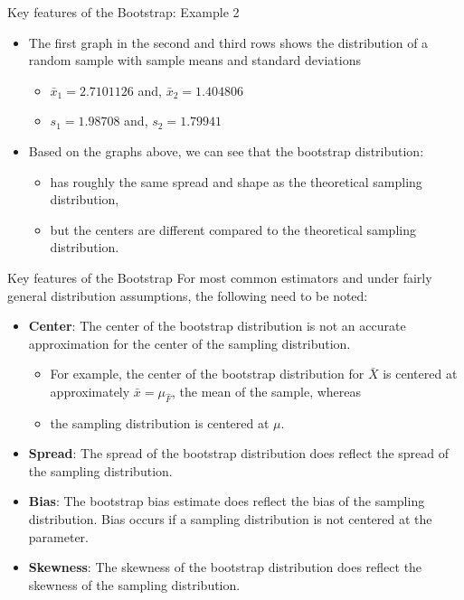\documentclass[
  ignorenonframetext,
]{beamer}
\providecommand{\tightlist}{%
  \setlength{\itemsep}{0pt}\setlength{\parskip}{0pt}}
\begin{document}
\begin{frame}{Key features of the Bootstrap: Example 2}
\label{key-features-of-the-bootstrap-example-2-3}
\begin{itemize}
\item
  The first graph in the second and third rows shows the distribution of
  a random sample with sample means and standard deviations

  \begin{itemize}
  \tightlist
  \item
    \(\bar{x}_1= 2.7101126\) and, \(\bar{x}_2=1.404806\)
  \item
    \(s_1= 1.98708\) and, \(s_2=1.79941\)
  \end{itemize}
\item
  Based on the graphs above, we can see that the bootstrap distribution:

  \begin{itemize}
  \tightlist
  \item
    has roughly the same spread and shape as the theoretical sampling
    distribution,
  \item
    but the centers are different compared to the theoretical sampling
    distribution.
  \end{itemize}
\end{itemize}
\end{frame}

\begin{frame}{Key features of the Bootstrap}
\label{key-features-of-the-bootstrap-1}
For most common estimators and under fairly general distribution
assumptions, the following need to be noted:

\begin{itemize}
\item
  \textbf{Center}: The center of the bootstrap distribution is not an
  accurate approximation for the center of the sampling distribution.

  \begin{itemize}
  \tightlist
  \item
    For example, the center of the bootstrap distribution for
    \(\bar{X}\) is centered at approximately \(\bar{x}=\mu_{\hat{F}}\),
    the mean of the sample, whereas
  \item
    the sampling distribution is centered at \(\mu\).
  \end{itemize}
\item
  \textbf{Spread}: The spread of the bootstrap distribution does reflect
  the spread of the sampling distribution.
\item
  \textbf{Bias}: The bootstrap bias estimate does reflect the bias of
  the sampling distribution. Bias occurs if a sampling distribution is
  not centered at the parameter.
\item
  \textbf{Skewness}: The skewness of the bootstrap distribution does
  reflect the skewness of the sampling distribution.
\end{itemize}
\end{frame}
\end{document}
